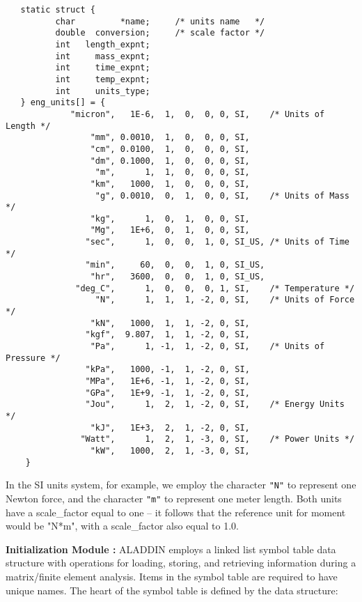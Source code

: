 \begin{footnotesize}
\begin{verbatim}
   static struct {
          char         *name;     /* units name   */
          double  conversion;     /* scale factor */
          int   length_expnt;   
          int     mass_expnt;
          int     time_expnt;
          int     temp_expnt;
          int     units_type;
   } eng_units[] = {
             "micron",   1E-6,  1,  0,  0, 0, SI,    /* Units of Length */
                 "mm", 0.0010,  1,  0,  0, 0, SI,
                 "cm", 0.0100,  1,  0,  0, 0, SI,
                 "dm", 0.1000,  1,  0,  0, 0, SI,
                  "m",      1,  1,  0,  0, 0, SI,
                 "km",   1000,  1,  0,  0, 0, SI,
                  "g", 0.0010,  0,  1,  0, 0, SI,    /* Units of Mass */
                 "kg",      1,  0,  1,  0, 0, SI,
                 "Mg",   1E+6,  0,  1,  0, 0, SI,
                "sec",      1,  0,  0,  1, 0, SI_US, /* Units of Time */
                "min",     60,  0,  0,  1, 0, SI_US,
                 "hr",   3600,  0,  0,  1, 0, SI_US, 
              "deg_C",      1,  0,  0,  0, 1, SI,    /* Temperature */
                  "N",      1,  1,  1, -2, 0, SI,    /* Units of Force */
                 "kN",   1000,  1,  1, -2, 0, SI,
                "kgf",  9.807,  1,  1, -2, 0, SI,
                 "Pa",      1, -1,  1, -2, 0, SI,    /* Units of Pressure */
                "kPa",   1000, -1,  1, -2, 0, SI,
                "MPa",   1E+6, -1,  1, -2, 0, SI,
                "GPa",   1E+9, -1,  1, -2, 0, SI,
                "Jou",      1,  2,  1, -2, 0, SI,    /* Energy Units */
                 "kJ",   1E+3,  2,  1, -2, 0, SI,
               "Watt",      1,  2,  1, -3, 0, SI,    /* Power Units */
                 "kW",   1000,  2,  1, -3, 0, SI,
    }
\end{verbatim}
\end{footnotesize}

\vspace{0.15 in}\noindent
In the SI units system, for example, we employ the
character {\tt "N"} to represent one Newton force,
and the character {\tt "m"} to represent one meter length.
Both units have a scale\_factor equal to one -- it follows that
the reference unit for moment would be "N*m",
with a scale\_factor also equal to 1.0.

\vspace{0.15 in}\noindent
{\bf Initialization Module :}
ALADDIN employs a linked list symbol table data structure with operations
for loading, storing, and retrieving information during a matrix/finite element analysis.
Items in the symbol table are required to have unique names.
The heart of the symbol table is defined by the data structure:

